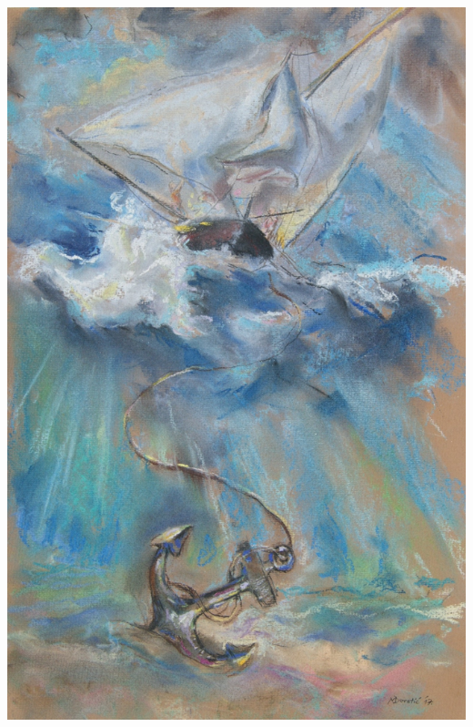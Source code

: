 \documentclass[a4paper,twoside, svgnames]{article}
\begin{document}
\begin{multicols}{2}
\begin{onehalfspacing}
\begin{justify}
\textit{}

\begin{center}
\includegraphics[width=\linewidth]{images/mihovil/a1_sidro}
\end{center}

\vfill


\end{justify}
\end{onehalfspacing}
\end{multicols}
\end{document}
